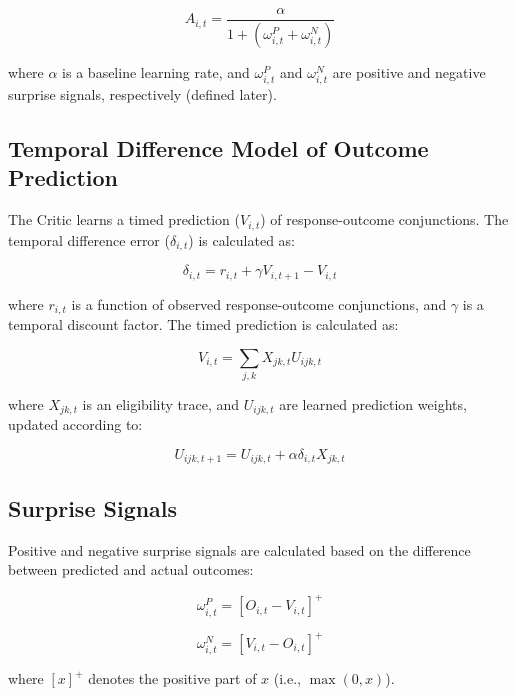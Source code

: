 \begin{equation}
A_{i,t} = \frac{\alpha}{1 + (\omega^P_{i,t} + \omega^N_{i,t})}
\end{equation}

where $\alpha$ is a baseline learning rate, and $\omega^P_{i,t}$ and $\omega^N_{i,t}$ are positive and negative surprise signals, respectively (defined later).

\subsection{Temporal Difference Model of Outcome Prediction}

The Critic learns a timed prediction ($V_{i,t}$) of response-outcome conjunctions.  The temporal difference error ($\delta_{i,t}$) is calculated as:

\begin{equation}
\delta_{i,t} = r_{i,t} + \gamma V_{i,t+1} - V_{i,t}
\end{equation}

where $r_{i,t}$ is a function of observed response-outcome conjunctions, and $\gamma$ is a temporal discount factor.  The timed prediction is calculated as:

\begin{equation}
V_{i,t} = \sum_{j,k} X_{jk,t} U_{ijk,t}
\end{equation}

where $X_{jk,t}$ is an eligibility trace, and $U_{ijk,t}$ are learned prediction weights, updated according to:

\begin{equation}
U_{ijk,t+1} = U_{ijk,t} + \alpha \delta_{i,t} X_{jk,t}
\end{equation}

\subsection{Surprise Signals}

Positive and negative surprise signals are calculated based on the difference between predicted and actual outcomes:

\begin{equation}
\omega^P_{i,t} = [O_{i,t} - V_{i,t}]^+
\end{equation}

\begin{equation}
\omega^N_{i,t} = [V_{i,t} - O_{i,t}]^+
\end{equation}

where $[x]^+$ denotes the positive part of $x$ (i.e., $\max(0, x)$).


